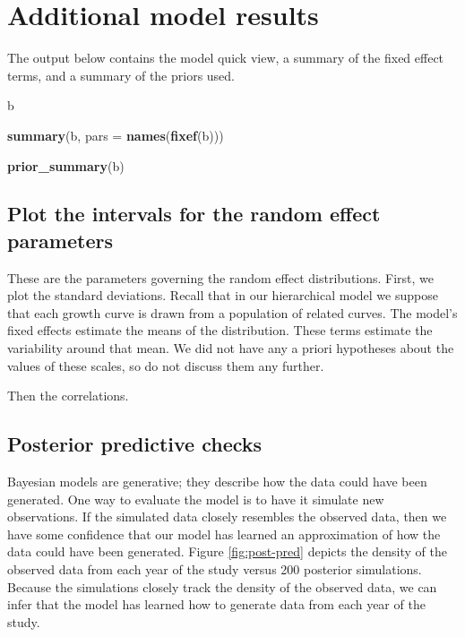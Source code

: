 \documentclass [11pt, proquest] {uwthesis}[2015/03/03]
\newenvironment{Shaded}{}{}
\newcommand{\KeywordTok}[1]{\textcolor[rgb]{0.00,0.44,0.13}{\textbf{{#1}}}}
\newcommand{\DataTypeTok}[1]{\textcolor[rgb]{0.56,0.13,0.00}{{#1}}}
\newcommand{\NormalTok}[1]{{#1}}
\begin{document}
\section{Additional model results}\label{additional-model-results}

The output below contains the model quick view, a summary of the fixed
effect terms, and a summary of the priors used.
\begin{Shaded}
\begin{Highlighting}[]
\NormalTok{b}

\KeywordTok{summary}\NormalTok{(b, }\DataTypeTok{pars =} \KeywordTok{names}\NormalTok{(}\KeywordTok{fixef}\NormalTok{(b)))}

\KeywordTok{prior_summary}\NormalTok{(b)}
\end{Highlighting}
\end{Shaded}
\subsection{Plot the intervals for the random effect
parameters}\label{plot-the-intervals-for-the-random-effect-parameters}

These are the parameters governing the random effect distributions.
First, we plot the standard deviations. Recall that in our hierarchical
model we suppose that each growth curve is drawn from a population of
related curves. The model's fixed effects estimate the means of the
distribution. These terms estimate the variability around that mean. We
did not have any a priori hypotheses about the values of these scales,
so do not discuss them any further.

Then the correlations.

\subsection{Posterior predictive
checks}\label{posterior-predictive-checks}

Bayesian models are generative; they describe how the data could have
been generated. One way to evaluate the model is to have it simulate new
observations. If the simulated data closely resembles the observed data,
then we have some confidence that our model has learned an approximation
of how the data could have been generated. Figure \ref{fig:post-pred}
depicts the density of the observed data from each year of the study
versus 200 posterior simulations. Because the simulations closely track
the density of the observed data, we can infer that the model has
learned how to generate data from each year of the study.
\end{document}
